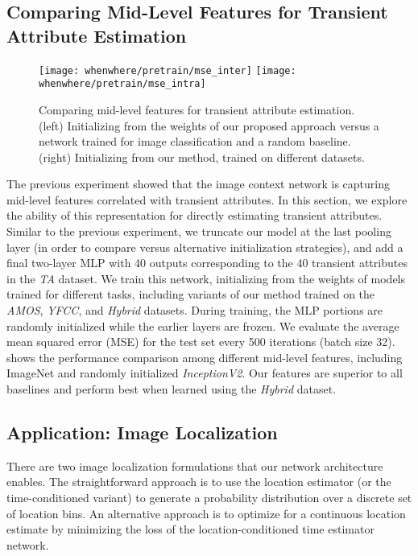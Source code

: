\subsection{Comparing Mid-Level Features for Transient Attribute Estimation}

\begin{figure}
  \centering
  
  \texttt{[image: whenwhere/pretrain/mse\_inter]}
  \texttt{[image: whenwhere/pretrain/mse\_intra]}
  
  \caption{Comparing mid-level features for transient attribute
  estimation. (left) Initializing from the weights of our proposed
  approach versus a network trained for image classification and a
  random baseline. (right) Initializing from our method, trained on
  different datasets.}
  
  \label{fig:pretrain}
\end{figure}

The previous experiment showed that the image context network is
capturing mid-level features correlated with transient attributes. In
this section, we explore the ability of this representation for
directly estimating transient attributes. Similar to the previous
experiment, we truncate our model at the last pooling layer (in order
to compare versus alternative initialization strategies), and add a
final two-layer MLP with 40 outputs corresponding to the 40 transient
attributes in the {\em TA} dataset. We train this
network, initializing from the weights of models trained for different
tasks, including variants of our method trained on the {\em AMOS}, {\em YFCC}, and
{\em Hybrid} datasets. During training, the MLP portions are randomly
initialized while the earlier layers are frozen. We evaluate the
average mean squared error (MSE) for the test set every 500 iterations
(batch size 32).  shows the performance comparison
among different mid-level features, including ImageNet and randomly
initialized {\em InceptionV2}. Our features are superior to
all baselines and perform best when learned using the {\em Hybrid} dataset. 


\subsection{Application: Image Localization}

There are two image localization formulations that our network
architecture enables. The straightforward approach is to use the
location estimator (or the time-conditioned variant) to generate a
probability distribution over a discrete set of location bins. An
alternative approach is to optimize for a continuous location estimate
by minimizing the loss of the location-conditioned time estimator
network.

